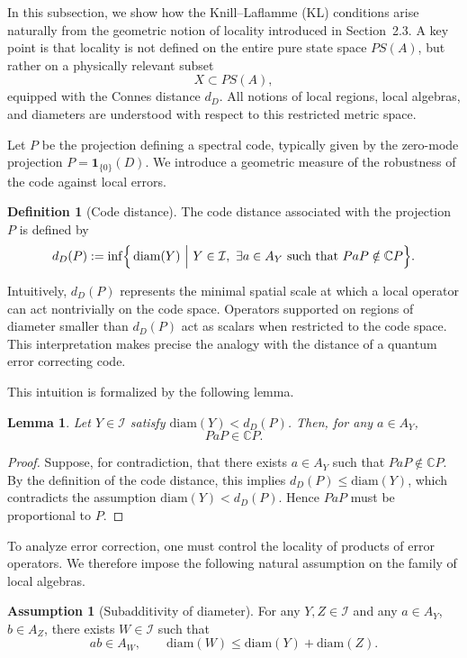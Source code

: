 \documentclass[12pt]{article}
\theoremstyle{definition} %
\newtheorem{definition}{Definition}
\newtheorem{assumption}{Assumption}
\theoremstyle{plain} %
\newtheorem{lemma}[theorem]{Lemma}
\theoremstyle{remark} %
\theoremstyle{underline}
\begin{document}
In this subsection, we show how the Knill--Laflamme (KL) conditions arise naturally from the geometric notion of locality introduced in Section~2.3. A key point is that locality is not defined on the entire pure state space $PS(A)$, but rather on a physically relevant subset
\[
    X \subset PS(A),
\]
equipped with the Connes distance $d_D$. All notions of local regions, local algebras, and diameters are understood with respect to this restricted metric space.

Let $P$ be the projection defining a spectral code, typically given by the zero-mode projection $P=\mathbf{1}_{\{0\}}(D)$. We introduce a geometric measure of the robustness of the code against local errors.

\begin{definition}[Code distance]
    The code distance associated with the projection $P$ is defined by
    \[
        d_D(P)
        := \inf \Bigl\{\, \mathrm{diam}(Y) \ \Big|\ Y\in\mathcal{I},\ \exists a\in A_Y \text{ such that } PaP \notin \mathbb{C}P \Bigr\}.
    \]
\end{definition}

Intuitively, $d_D(P)$ represents the minimal spatial scale at which a local operator can act nontrivially on the code space. Operators supported on regions of diameter smaller than $d_D(P)$ act as scalars when restricted to the code space.
This interpretation makes precise the analogy with the distance of a quantum error correcting code.

This intuition is formalized by the following lemma.

\begin{lemma}
    Let $Y\in\mathcal{I}$ satisfy $\mathrm{diam}(Y)< d_D(P)$. Then, for any $a\in A_Y$,
    \[
        PaP \in \mathbb{C}P.
    \]
\end{lemma}

\begin{proof}
    Suppose, for contradiction, that there exists $a\in A_Y$ such that $PaP \notin \mathbb{C}P$. By the definition of the code distance, this implies $d_D(P)\le \mathrm{diam}(Y)$, which contradicts the assumption $\mathrm{diam}(Y)< d_D(P)$. Hence $PaP$ must be proportional to $P$.
\end{proof}

To analyze error correction, one must control the locality of products of error operators. We therefore impose the following natural assumption on the family of local algebras.

\begin{assumption}[Subadditivity of diameter]
    For any $Y,Z\in\mathcal{I}$ and any $a\in A_Y$, $b\in A_Z$, there exists $W\in\mathcal{I}$ such that
    \[
        ab \in A_W,
        \qquad
        \mathrm{diam}(W)\le \mathrm{diam}(Y)+\mathrm{diam}(Z).
    \]
\end{assumption}
\end{document}
